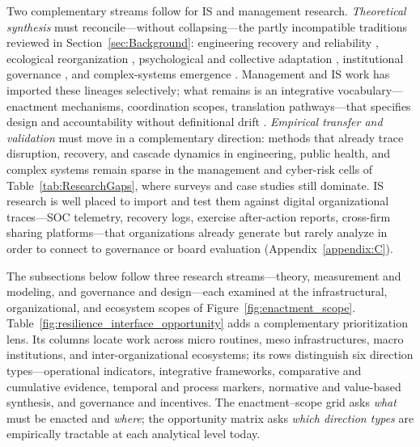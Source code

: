 Two complementary streams follow for IS and management research. \emph{Theoretical synthesis} must reconcile---without collapsing---the partly incompatible traditions reviewed in Section~\ref{sec:Background}: engineering recovery and reliability \autocite{bruneau2003framework,panteli2017metrics}, ecological reorganization \autocite{holling1973resilience,folke2010resilience}, psychological and collective adaptation \autocite{luthar2000construct,ungar2021modeling}, institutional governance \autocite{ostrom1990governing}, and complex-systems emergence \autocite{gao2016universal,benbya2020complex,krakovska2023resilience}. Management and IS work has imported these lineages selectively; what remains is an integrative vocabulary---enactment mechanisms, coordination scopes, translation pathways---that specifies design and accountability without definitional drift \autocite{woods2015four,hillmann2021organizational}. \emph{Empirical transfer and validation} must move in a complementary direction: methods that already trace disruption, recovery, and cascade dynamics in engineering, public health, and complex systems \autocite{cutter2010disaster,dawson2011agentbased,francis2014metric,kruk2017building,aerts2018integrating} remain sparse in the management and cyber-risk cells of Table~\ref{tab:ResearchGaps}, where surveys and case studies still dominate. IS research is well placed to import and test them against digital organizational traces---SOC telemetry, recovery logs, exercise after-action reports, cross-firm sharing platforms---that organizations already generate but rarely analyze in order to connect to governance or board evaluation (Appendix~\ref{appendix:C}).

The subsections below follow three research streams---theory, measurement and modeling, and governance and design---each examined at the infrastructural, organizational, and ecosystem scopes of Figure~\ref{fig:enactment_scope}. Table~\ref{fig:resilience_interface_opportunity} adds a complementary prioritization lens. Its columns locate work across micro routines, meso infrastructures, macro institutions, and inter-organizational ecosystems; its rows distinguish six direction types---operational indicators, integrative frameworks, comparative and cumulative evidence, temporal and process markers, normative and value-based synthesis, and governance and incentives. The enactment--scope grid asks \emph{what} must be enacted and \emph{where}; the opportunity matrix asks \emph{which direction types} are empirically tractable at each analytical level today.

